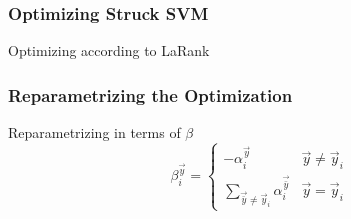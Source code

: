 \begin{frame}
    \frametitle{Optimizing Struck SVM}
    Optimizing according to LaRank \cite{Bordes:2007:SMS:1273496.1273508}
    \struckDualAlpha
\end{frame}

\begin{frame}
    \frametitle{Reparametrizing the Optimization}
    Reparametrizing in terms of \(\beta\) \cite{Bordes:2007:SMS:1273496.1273508}
    \[ \beta_i^\vec{y} = \begin{cases}
        -\alpha_i^\vec{y} & \vec{y} \ne \vec{y}_i \\
        \sum_{\vec{\bar{y}} \ne \vec{y}_i} \alpha_i^\vec{\bar{y}} & \vec{y} = \vec{y}_i
    \end{cases} \]
    \struckDualBeta
\end{frame}
